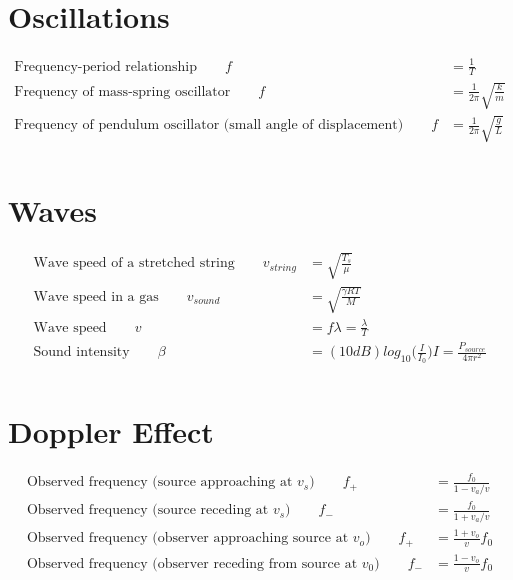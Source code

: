 \documentclass[]{article}
\begin{document}
\newpage


\section{Oscillations}

\begin{align*}
	\text{Frequency-period relationship} \qquad f &= \frac{1}{T} \\
	\text{Frequency of mass-spring oscillator} \qquad f &= \frac{1}{2 \pi} \sqrt{\frac{k}{m}} \\
	\text{Frequency of pendulum oscillator (small angle of displacement)} \qquad f &= \frac{1}{2 \pi} \sqrt{\frac{g}{L}} \\
\end{align*}

\newpage


\section{Waves}

\begin{align*}
	\text{Wave speed of a stretched string} \qquad v_{string} &= \sqrt{\frac{T_s}{\mu}} \\
	\text{Wave speed in a gas} \qquad v_{sound} &= \sqrt{\frac{\gamma R T}{M}} \\
	\text{Wave speed} \qquad v &= f \lambda = \frac{\lambda}{T} \\
	\text{Sound intensity} \qquad \beta &= (10 dB) log_{10}\big(\frac{I}{I_0} \big) I = \frac{P_{source}}{4 \pi r^2} \\
\end{align*}

\newpage


\section{Doppler Effect}

\begin{align*}
	\text{Observed frequency (source approaching at $v_s$)} \qquad f_{+} &= \frac{f_0}{1 - v_a/v} \\
	\text{Observed frequency (source receding at $v_s$)} \qquad f_{-} &= \frac{f_0}{1 + v_a/v} \\
	\text{Observed frequency (observer approaching source at $v_o$)} \qquad f_{+} &= \frac{1 + v_o}{v} f_0 \\
	\text{Observed frequency (observer receding from source at $v_0$)} \qquad f_{-} &= \frac{1 - v_o}{v} f_0 \\
\end{align*}
\end{document}
